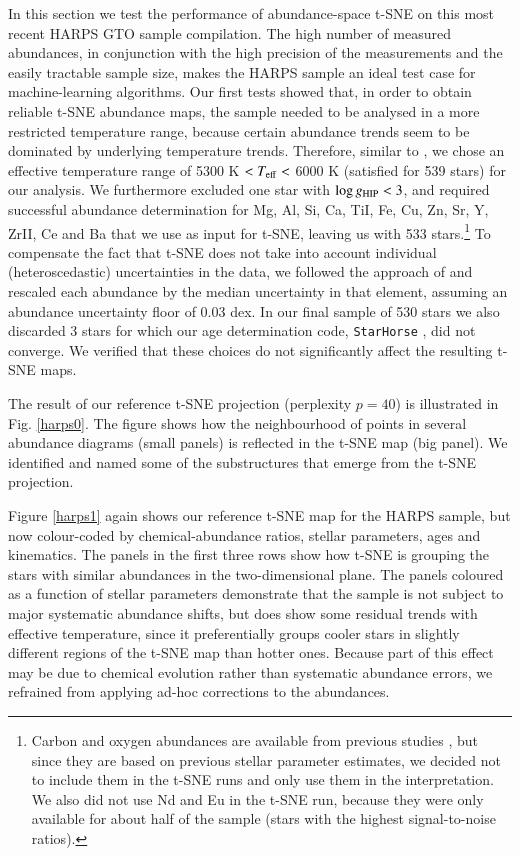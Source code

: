 \documentclass{aa}  %
\begin{document}
In this section we test the performance of abundance-space t-SNE on this most recent HARPS GTO sample compilation. The high number of measured abundances, in conjunction with the high precision of the measurements and the easily tractable sample size, makes the HARPS sample an ideal test case for machine-learning algorithms. 
Our first tests showed that, in order to obtain reliable t-SNE abundance maps, the sample needed to be analysed in a more restricted temperature range, because certain abundance trends seem to be dominated by underlying temperature trends. Therefore, similar to \citet{DelgadoMena2017}, we chose an effective temperature range of 5300 K $<T_{\rm eff}<$ 6000 K (satisfied for 539 stars) for our analysis. We furthermore excluded one star with $\log g_{\rm HIP}<3$, and required successful abundance determination for Mg, Al, Si, Ca, TiI, Fe, Cu, Zn, Sr, Y, ZrII, Ce and Ba that we use as input for t-SNE, leaving us with 533 stars.\footnote{Carbon and oxygen abundances are available from previous studies \citep{Suarez-Andres2017, BertrandeLis2015}, but since they are based on previous stellar parameter estimates, we decided not to include them in the t-SNE runs and only use them in the interpretation. We also did not use Nd and Eu in the t-SNE run, because they were only available for about half of the sample (stars with the highest signal-to-noise ratios).} To compensate the fact that t-SNE does not take into account individual (heteroscedastic) uncertainties in the data, we followed the approach of \citet{Hogg2016} and rescaled each abundance by the median uncertainty in that element, assuming an abundance uncertainty floor of 0.03 dex. In our final sample of 530 stars we also discarded 3 stars for which our age determination code, {\tt StarHorse} \citep{Santiago2016, Queiroz2018}, did not converge. We verified that these choices do not significantly affect the resulting t-SNE maps. 

The result of our reference t-SNE projection (perplexity $p=40$) is illustrated in Fig. \ref{harps0}. The figure shows how the neighbourhood of points in several abundance diagrams (small panels) is reflected in the t-SNE map (big panel). We identified and named some of the substructures that emerge from the t-SNE projection. 

Figure \ref{harps1} again shows our reference t-SNE map for the HARPS sample, but now colour-coded by chemical-abundance ratios, stellar parameters, ages and kinematics. The panels in the first three rows show how t-SNE is grouping the stars with similar abundances in the two-dimensional plane. The panels coloured as a function of stellar parameters demonstrate that the sample is not subject to major systematic abundance shifts, but does show some residual trends with effective temperature, since it preferentially groups cooler stars in slightly different regions of the t-SNE map than hotter ones. Because part of this effect may be due to chemical evolution rather than systematic abundance errors, we refrained from applying ad-hoc corrections to the abundances. 
\end{document}
